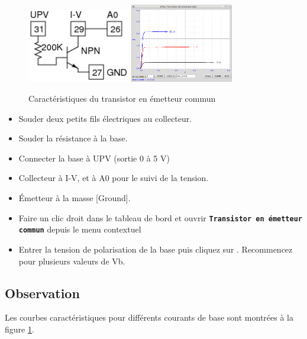 \documentclass{book}
\newcommand{\nop}{}
\begin{document}
\begin{figure}[h!]
\begin{center}
\caption{\label{fig:Transistor-common-emitter}Caractéristiques du transistor en émetteur commun }\vspace{0.5em}
\includegraphics[width=0.4\textwidth, height=0.3\textwidth, keepaspectratio]{Schematic-tran-ce.png}
\includegraphics[width=0.4\textwidth, height=0.3\textwidth, keepaspectratio]{Pic-tran-ce.png}
\end{center}
\end{figure}
\begin{itemize}
  \item Souder deux petits fils électriques au collecteur.
  \item Souder la résistance à la base.
  \item Connecter la base à UPV (sortie 0 à 5 V)
  \item Collecteur à I-V, et à A0 pour le suivi de la tension.
  \item Émetteur à la masse [Ground].
  \item Faire un clic droit dans le tableau de bord et ouvrir  \texttt{\textbf{Transistor en émetteur commun}\nop} depuis le menu contextuel
  \item Entrer la tension de polarisation de la base puis cliquez sur  . Recommencez pour plusieurs valeurs de Vb.
\end{itemize}

\subsection{Observation}


Les courbes caractéristiques pour différents courants de base sont montrées à la figure  \ref{fig:Transistor-common-emitter}.
\end{document}
